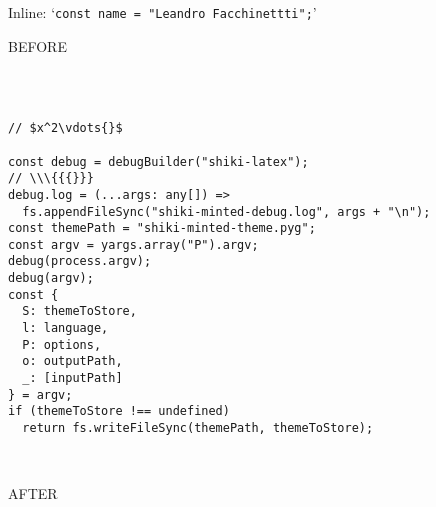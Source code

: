 \documentclass{article}
\begin{document}
Inline: ‘\texttt{const name = "Leandro Facchinettti";}’

BEFORE
\begin{verbatim}



// $x^2\vdots{}$

const debug = debugBuilder("shiki-latex");
// \\\{{{}}}
debug.log = (...args: any[]) =>
  fs.appendFileSync("shiki-minted-debug.log", args + "\n");
const themePath = "shiki-minted-theme.pyg";
const argv = yargs.array("P").argv;
debug(process.argv);
debug(argv);
const {
  S: themeToStore,
  l: language,
  P: options,
  o: outputPath,
  _: [inputPath]
} = argv;
if (themeToStore !== undefined)
  return fs.writeFileSync(themePath, themeToStore);



\end{verbatim}
AFTER
\end{document}
